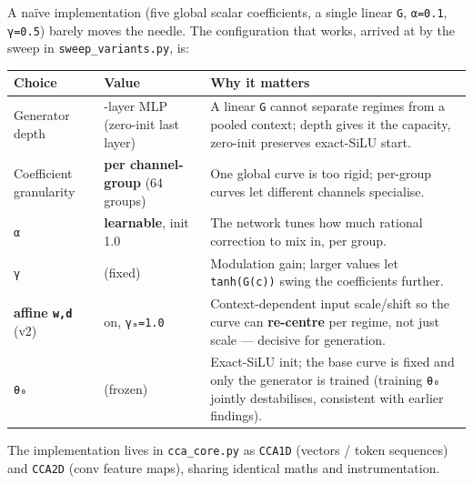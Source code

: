 \documentclass[
  11pt,
]{article}
\newcounter{none} %
\begin{document}
A naïve implementation (five global scalar coefficients, a single linear
\texttt{G}, \texttt{α=0.1}, \texttt{γ=0.5}) barely moves the needle. The
configuration that works, arrived at by the sweep in
\texttt{sweep\_variants.py}, is:

{\def\LTcaptype{none} %
\begin{longtable}[]{@{}
  >{\raggedright\arraybackslash}p{}
  >{\raggedright\arraybackslash}p{}
  >{\raggedright\arraybackslash}p{}@{}}
\toprule\noalign{}
\begin{minipage}[b]{\linewidth}\raggedright
Choice
\end{minipage} & \begin{minipage}[b]{\linewidth}\raggedright
Value
\end{minipage} & \begin{minipage}[b]{\linewidth}\raggedright
Why it matters
\end{minipage} \\
\midrule\noalign{}
\endhead
\bottomrule\noalign{}
\endlastfoot
Generator depth & 2-layer MLP (zero-init last layer) & A linear
\texttt{G} cannot separate regimes from a pooled context; depth gives it
the capacity, zero-init preserves exact-SiLU start. \\
Coefficient granularity & \textbf{per channel-group} (64 groups) & One
global curve is too rigid; per-group curves let different channels
specialise. \\
\texttt{α} & \textbf{learnable}, init 1.0 & The network tunes how much
rational correction to mix in, per group. \\
\texttt{γ} & 2.0 (fixed) & Modulation gain; larger values let
\texttt{tanh(G(c))} swing the coefficients further. \\
\textbf{affine \texttt{w,d}} (v2) & on, \texttt{γₐ=1.0} &
Context-dependent input scale/shift so the curve can \textbf{re-centre}
per regime, not just scale --- decisive for generation. \\
\texttt{θ₀} & 0 (frozen) & Exact-SiLU init; the base curve is fixed and
only the generator is trained (training \texttt{θ₀} jointly
destabilises, consistent with earlier findings). \\
\end{longtable}
}

The implementation lives in \texttt{cca\_core.py} as \texttt{CCA1D}
(vectors / token sequences) and \texttt{CCA2D} (conv feature maps),
sharing identical maths and instrumentation.
\end{document}
